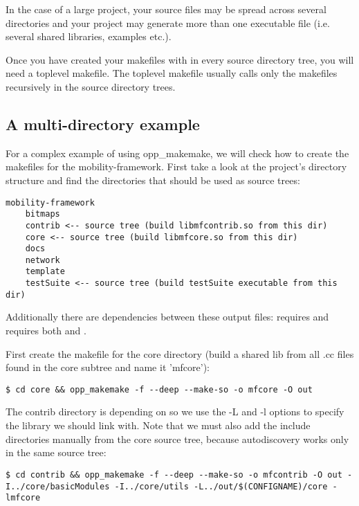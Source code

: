 In the case of a large project, your source files may be spread across
several directories and your project may generate more than one executable
file (i.e. several shared libraries, examples etc.).

Once you have created your makefiles with  in
every source directory tree, you will need a toplevel makefile.
The toplevel makefile usually calls only the makefiles
recursively in the source directory trees.


\subsection{A multi-directory example}

For a complex example of using opp\_makemake, we will check how to create
the makefiles for the mobility-framework. First take a look at the
project's directory structure and find the directories that should be used as
source trees:

\begin{verbatim}
mobility-framework
    bitmaps
    contrib <-- source tree (build libmfcontrib.so from this dir)
    core <-- source tree (build libmfcore.so from this dir)
    docs
    network
    template
    testSuite <-- source tree (build testSuite executable from this dir)
\end{verbatim}

Additionally there are dependencies between these output files: 
requires  and  requires both 
and .

First create the makefile for the core directory (build a shared lib from all .cc files
found in the core subtree and name it 'mfcore'):

\begin{verbatim}
$ cd core && opp_makemake -f --deep --make-so -o mfcore -O out
\end{verbatim}

The contrib directory is depending on  so we use the -L and -l options
to specify the library we should link with. Note that we must also add
the include directories manually from the core source tree, because autodiscovery works only
in the same source tree:

\begin{verbatim}
$ cd contrib && opp_makemake -f --deep --make-so -o mfcontrib -O out -I../core/basicModules -I../core/utils -L../out/$(CONFIGNAME)/core -lmfcore
\end{verbatim}

